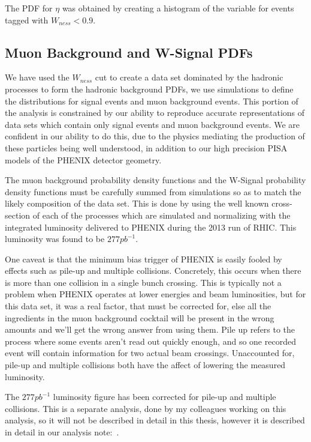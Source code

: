 The PDF for $\eta$ was obtained by creating a histogram of the variable for
events tagged with $W_{ness} < 0.9$. 

\clearpage
\subsection{Muon Background and W-Signal PDFs}

We have used the $W_{ness}$ cut to create a data set dominated by the
hadronic processes to form the hadronic background PDFs, we use simulations to
define the distributions for signal events and muon background events. This
portion of the analysis is constrained by our ability to reproduce accurate
representations of data sets which contain only signal events and muon
background events. We are confident in our ability to do this, due to the
physics mediating the production of these particles being well understood, in
addition to our high precision PISA models of the PHENIX detector geometry.

The muon background probability density functions and the W-Signal probability
density functions must be carefully summed from simulations so as to match the
likely composition of the data set. This is done by using the well known
cross-section of each of the processes which are simulated and normalizing with
the integrated luminosity delivered to PHENIX during the 2013 run of RHIC. This
luminosity was found to be $277 pb^{-1}$.

One caveat is that the minimum bias trigger of PHENIX is easily fooled by
effects such as pile-up and multiple collisions. Concretely, this occurs when
there is more than one collision in a single bunch crossing. This is typically
not a problem when PHENIX operates at lower energies and beam luminosities, but
for this data set, it was a real factor, that must be corrected for, else all
the ingredients in the muon background cocktail will be present in the wrong
amounts and we'll get the wrong answer from using them. Pile up refers to the
process where some events aren't read out quickly enough, and so one recorded
event will contain information for two actual beam crossings. Unaccounted for,
pile-up and multiple collisions both have the affect of lowering the measured
luminosity. 

The $277 pb^{-1}$ luminosity figure has been corrected for pile-up and multiple
collisions. This is a separate analysis, done by my colleagues working on this
analysis, so it will not be described in detail in this thesis, however it is
described in detail in our analysis note:~\cite{Seidl2014a}.

